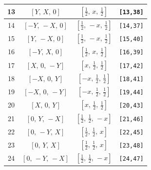 \documentclass[fleqn,8pt]{jsarticle}
\begin{document}
\begin{longtable}{cccc}
13 & $\left[ Y,\, X,\, 0 \right]$ & $\left[ \frac{1}{2},\, x,\, \frac{1}{2} \right]$ & {\tt [13,38]} \\ \hline
14 & $\left[ - Y,\, - X,\, 0 \right]$ & $\left[ \frac{1}{2},\, - x,\, \frac{1}{2} \right]$ & {\tt [14,37]} \\ \hline
15 & $\left[ Y,\, - X,\, 0 \right]$ & $\left[ \frac{1}{2},\, - x,\, \frac{1}{2} \right]$ & {\tt [15,40]} \\ \hline
16 & $\left[ - Y,\, X,\, 0 \right]$ & $\left[ \frac{1}{2},\, x,\, \frac{1}{2} \right]$ & {\tt [16,39]} \\ \hline
17 & $\left[ X,\, 0,\, - Y \right]$ & $\left[ x,\, \frac{1}{2},\, \frac{1}{2} \right]$ & {\tt [17,42]} \\ \hline
18 & $\left[ - X,\, 0,\, Y \right]$ & $\left[ - x,\, \frac{1}{2},\, \frac{1}{2} \right]$ & {\tt [18,41]} \\ \hline
19 & $\left[ - X,\, 0,\, - Y \right]$ & $\left[ - x,\, \frac{1}{2},\, \frac{1}{2} \right]$ & {\tt [19,44]} \\ \hline
20 & $\left[ X,\, 0,\, Y \right]$ & $\left[ x,\, \frac{1}{2},\, \frac{1}{2} \right]$ & {\tt [20,43]} \\ \hline
21 & $\left[ 0,\, Y,\, - X \right]$ & $\left[ \frac{1}{2},\, \frac{1}{2},\, - x \right]$ & {\tt [21,46]} \\ \hline
22 & $\left[ 0,\, - Y,\, X \right]$ & $\left[ \frac{1}{2},\, \frac{1}{2},\, x \right]$ & {\tt [22,45]} \\ \hline
23 & $\left[ 0,\, Y,\, X \right]$ & $\left[ \frac{1}{2},\, \frac{1}{2},\, x \right]$ & {\tt [23,48]} \\ \hline
24 & $\left[ 0,\, - Y,\, - X \right]$ & $\left[ \frac{1}{2},\, \frac{1}{2},\, - x \right]$ & {\tt [24,47]} \\
\end{longtable}
\renewcommand{\arraystretch}{1.2}
\end{document}
